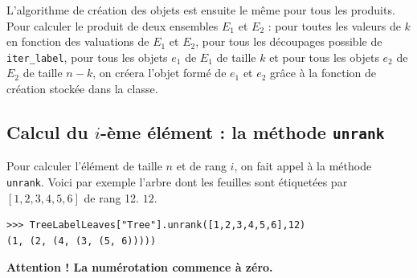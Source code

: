 \documentclass[11pt]{article}
\begin{document}
L'algorithme de création des objets est ensuite le même pour tous les produits. 
Pour calculer le produit de deux ensembles $E_1$ et $E_2$ : pour toutes les valeurs
de $k$ en fonction des valuations de $E_1$ et $E_2$, pour tous les découpages possible 
de {\tt iter\_label}, pour tous les objets $e_1$ de $E_1$ de taille $k$ et pour tous
les objets $e_2$ de $E_2$ de taille $n-k$, on créera l'objet formé de $e_1$ et $e_2$
grâce à la fonction de création stockée dans la classe.



\subsection{Calcul du $i$-ème élément : la méthode \texttt{unrank}}

Pour calculer l'élément de taille $n$ et de rang $i$, on fait appel à la
méthode \texttt{unrank}. Voici par exemple l'arbre dont les feuilles
sont étiquetées par $[1,2,3,4,5,6]$ de rang 12.
$12$.
\begin{verbatim}
>>> TreeLabelLeaves["Tree"].unrank([1,2,3,4,5,6],12)
(1, (2, (4, (3, (5, 6)))))
\end{verbatim}
\textbf{Attention ! La numérotation commence à zéro.}
\end{document}
